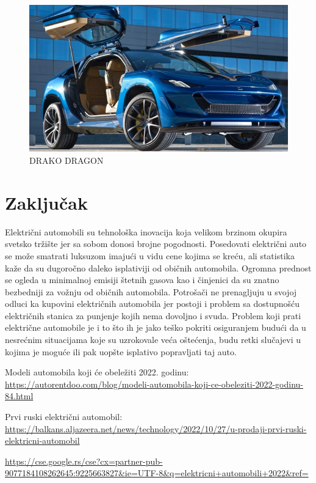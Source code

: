 \documentclass[a4paper]{article}
\begin{document}
\begin{figure}[h]
        \centering
        \includegraphics[width=\linewidth]{DRAKO.jpg}
        \caption{DRAKO DRAGON}
        \label{fig:img_DRAKO}
        \end{figure}


\newpage

\section{Zaključak}
\label{sec:zakljucak}

Električni automobili su tehnološka inovacija koja velikom brzinom okupira svetsko tržište jer sa sobom donosi brojne pogodnosti. Posedovati električni auto se može smatrati luksuzom imajući u vidu cene kojima se kreću, ali statistika kaže da su dugoročno daleko isplativiji od običnih automobila. Ogromna prednost se ogleda u minimalnoj emisiji štetnih gasova kao i činjenici da su znatno bezbedniji za vožnju od običnih automobila. Potrošači ne prenagljuju u svojoj odluci ka kupovini električnih automobila jer postoji i problem sa dostupnošću električnih stanica za punjenje kojih nema dovoljno i svuda. Problem koji prati električne automobile je i to što ih je jako teško pokriti osiguranjem budući da u nesrećnim situacijama koje su uzrokovale veća oštećenja, budu retki slučajevi u kojima je moguće ili pak uopšte isplativo popravljati taj auto.


\appendix

\begin{thebibliography}{9}

Modeli automobila koji će obeležiti 2022. godinu: \url{https://autorentdoo.com/blog/modeli-automobila-koji-ce-obeleziti-2022-godinu-84.html}

 Prvi ruski električni automobil: \url{https://balkans.aljazeera.net/news/technology/2022/10/27/u-prodaji-prvi-ruski-elektricni-automobil}

 \url{https://cse.google.rs/cse?cx=partner-pub-9077184108262645:9225663827&ie=UTF-8&q=elektricni+automobili+2022&ref=}


\end{thebibliography}
\end{document}
